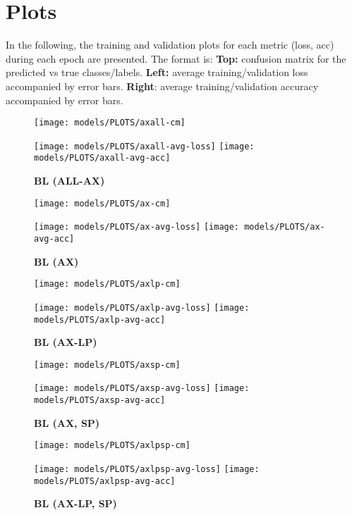 \section{Plots}
In the following, the training and validation plots for each metric (loss, acc) during each epoch are presented. The format is: \textbf{Top:} confusion matrix for the predicted vs true classes/labels. \textbf{Left:} average training/validation loss accompanied by error bars. \textbf{Right}: average training/validation accuracy accompanied by error bars.

\begin{figure}[H]
	\centering
	\texttt{[image: models/PLOTS/axall-cm]}
	
	\texttt{[image: models/PLOTS/axall-avg-loss]}
	\texttt{[image: models/PLOTS/axall-avg-acc]}
	\caption{\textbf{BL (ALL-AX)}}
\end{figure}

\begin{figure}[H]
	\centering
	\texttt{[image: models/PLOTS/ax-cm]}
	
	\texttt{[image: models/PLOTS/ax-avg-loss]}
	\texttt{[image: models/PLOTS/ax-avg-acc]}
	\caption{\textbf{BL (AX)}}
\end{figure}

\begin{figure}[H]
	\centering
	\texttt{[image: models/PLOTS/axlp-cm]}
	
	\texttt{[image: models/PLOTS/axlp-avg-loss]}
	\texttt{[image: models/PLOTS/axlp-avg-acc]}
	\caption{\textbf{BL (AX-LP)}}
\end{figure}

\begin{figure}[H]
	\centering
	\texttt{[image: models/PLOTS/axsp-cm]}
	
	\texttt{[image: models/PLOTS/axsp-avg-loss]}
	\texttt{[image: models/PLOTS/axsp-avg-acc]}
	\caption{\textbf{BL (AX, SP)}}
\end{figure}

\begin{figure}[H]
	\centering
	\texttt{[image: models/PLOTS/axlpsp-cm]}
	
	\texttt{[image: models/PLOTS/axlpsp-avg-loss]}
	\texttt{[image: models/PLOTS/axlpsp-avg-acc]}
	\caption{\textbf{BL (AX-LP, SP)}}
\end{figure}

